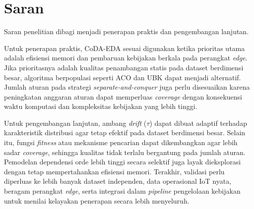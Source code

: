 \section{Saran}

Saran penelitian dibagi menjadi penerapan praktis dan pengembangan lanjutan.

Untuk penerapan praktis, CoDA-EDA sesuai digunakan ketika prioritas utama adalah efisiensi memori dan pembaruan kebijakan berkala pada perangkat \textit{edge}. 
Jika prioritasnya adalah kualitas penambangan statis pada dataset berdimensi besar, algoritma berpopulasi seperti ACO dan UBK dapat menjadi alternatif. 
Jumlah aturan pada strategi \textit{separate-and-conquer} juga perlu disesuaikan karena peningkatan anggaran aturan dapat memperluas \textit{coverage} dengan konsekuensi waktu komputasi dan kompleksitas kebijakan yang lebih tinggi.

Untuk pengembangan lanjutan, ambang \textit{drift} ($\tau$) dapat dibuat adaptif terhadap karakteristik distribusi agar tetap efektif pada dataset berdimensi besar. 
Selain itu, fungsi \textit{fitness} atau mekanisme pencarian dapat dikembangkan agar lebih sadar \textit{coverage}, sehingga kualitas tidak terlalu bergantung pada jumlah aturan. 
Pemodelan dependensi orde lebih tinggi secara selektif juga layak dieksplorasi dengan tetap mempertahankan efisiensi memori. 
Terakhir, validasi perlu diperluas ke lebih banyak dataset independen, data operasional IoT nyata, beragam perangkat \textit{edge}, serta integrasi dalam \textit{pipeline} pengelolaan kebijakan untuk menilai kelayakan penerapan secara lebih menyeluruh.